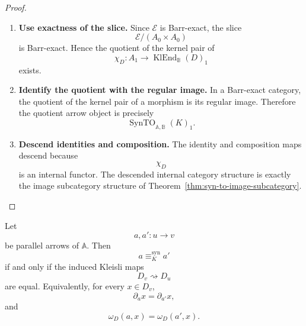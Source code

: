 \begin{proof}
    \leavevmode
    \begin{enumerate}
        \item \textbf{Use exactness of the slice.}
        Since \(\mathcal E\) is Barr-exact, the slice
        \[
            \mathcal E/(A_0\times A_0)
        \]
        is Barr-exact. Hence the quotient of the kernel pair of
        \[
            \chi_D:
            A_1\to\operatorname{KlEnd}_{\mathbb B}(D)_1
        \]
        exists.

        \item \textbf{Identify the quotient with the regular image.}
        In a Barr-exact category, the quotient of the kernel pair of a morphism
        is its regular image. Therefore the quotient arrow object is precisely
        \[
            \operatorname{SynTO}_{\mathbb A,\mathbb B}(K)_1.
        \]

        \item \textbf{Descend identities and composition.}
        The identity and composition maps descend because
        \[
            \chi_D
        \]
        is an internal functor. The descended internal category structure is
        exactly the image subcategory structure of
        Theorem~\ref{thm:syn-to-image-subcategory}.
    \end{enumerate}
\end{proof}

\begin{proposition}
\label{prop:syn-to-congruence-normal-form}
    Let
    \[
        a,a':u\to v
    \]
    be parallel arrows of \(\mathbb A\). Then
    \[
        a\equiv_K^{\mathrm{syn}}a'
    \]
    if and only if the induced Kleisli maps
    \[
        D_v\rightsquigarrow D_u
    \]
    are equal. Equivalently, for every \(x\in D_v\),
    \[
        \partial_a x=\partial_{a'}x,
    \]
    and
    \[
        \omega_D(a,x)=\omega_D(a',x).
    \]
\end{proposition}

